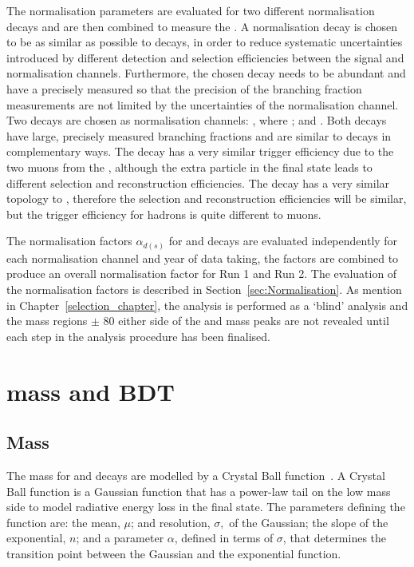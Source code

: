 The normalisation parameters are evaluated for two different normalisation decays and are then combined to measure the \bmumu \BFs. 
A normalisation decay is chosen to be as similar as possible to \bmumu decays, in order to reduce systematic uncertainties introduced by different detection and selection efficiencies between the signal and normalisation channels. Furthermore, the chosen decay needs to be abundant and have a precisely measured \BF so that the precision of the \bmumu branching fraction measurements are not limited by the uncertainties of the normalisation channel. Two decays are chosen as normalisation channels: \bujpsik, where \jpsimumu; and \bdkpi. Both decays have large, precisely measured branching fractions and are similar to \bmumu decays in complementary ways. The \bujpsik decay has a very similar trigger efficiency due to the two muons from the \jpsi, although the extra particle in the final state leads to different selection and reconstruction efficiencies. The \bdkpi decay has a very similar topology to \bmumu, therefore the selection and reconstruction efficiencies will be similar, but the trigger efficiency for hadrons is quite different to muons.  

The normalisation factors $\alpha_{d(s)}$ for \bdmumu and \bsmumu decays are evaluated independently for each normalisation channel and year of data taking, the factors are combined to produce an overall normalisation factor for Run 1 and Run 2. The evaluation of the normalisation factors is described in Section~\ref{sec:Normalisation}.
As mention in Chapter~\ref{selection_chapter}, the analysis is performed as a `blind' analysis and the mass regions $\pm$ 80 \mevcc either side of the \bs and \bd mass peaks are not revealed until each step in the analysis procedure has been finalised. 
\section[\bmumu mass and BDT \pdfs]{\boldmath{\bmumu} mass and BDT \pdfs}
\label{sec:signalPdfs}

\subsection{Mass \pdfs}
The mass \pdfs for \bdmumu and \bsmumu decays are modelled by a Crystal Ball function~\cite{Skwarnicki:1986xj}. A Crystal Ball function is a Gaussian function that has a power-law tail on the low mass side to model radiative energy loss in the final state. The parameters defining the function are: the mean, $\mu$; and resolution, $\sigma,$ of the Gaussian; the slope of the exponential, $n$; and a parameter $\alpha$, defined in terms of $\sigma$, that determines the transition point between the Gaussian and the exponential function. 

